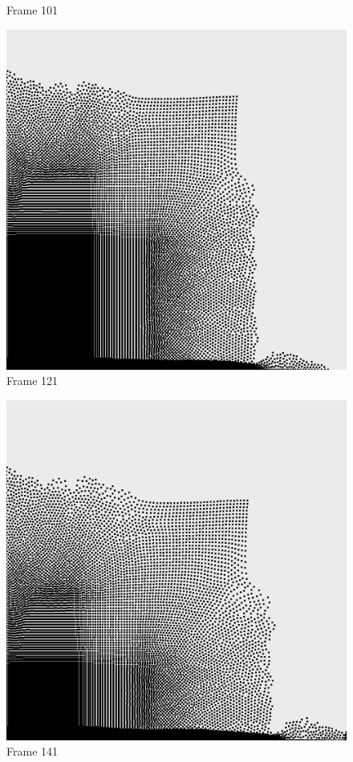 \documentclass[a4paper, 12pt, oneside]{book}
\begin{document}
\begin{figure}[!ht]
\begin{center}
            Frame 101
        \end{center}
    \endminipage
    \hfill
        \begin{center}
            \includegraphics[width=\linewidth]{images/test_case_2/121.png}
            Frame 121
        \end{center}
    \endminipage
    \hfill
        \begin{center}
            \includegraphics[width=\linewidth]{images/test_case_2/141.png}
            Frame 141
        \end{center}
    \endminipage
    \hfill


\end{figure}
\end{document}
